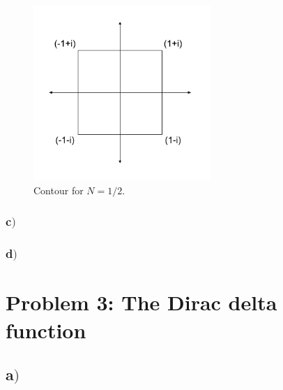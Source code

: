 \documentclass{article}
\begin{document}
\begin{figure}[h]
\centering
\includegraphics[width=0.6\textwidth]{complex_contour}
\caption{Contour for $N=1/2$.}
\label{fig:figure_label}
\end{figure}




\subsubsection*{c$)$}

\subsubsection*{d$)$}

\section*{Problem 3: The Dirac delta function}

\subsection*{a$)$}

\end{document}
